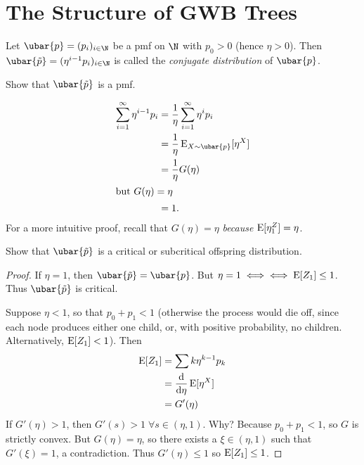 \section{The Structure of GWB Trees}
\begin{definition} \label{def:conjugate}
    Let $\ubar{p} = (p_i)_{i \in \N}$ be a pmf on $\N$ with $p_0 > 0$
    (hence $\eta > 0$).
    Then $\ubar{\tilde{p}} = (\eta^{i-1} p_i)_{i \in \N}$ is called the
    \emph{conjugate distribution} of $\ubar{p}$.
\end{definition}

\begin{exercise}
    Show that $\ubar{\tilde{p}}$ is a pmf.
\end{exercise}
\begin{solution}
    \begin{align*}
        \sum_{i=1}^\infty \eta^{i-1} p_i
            &= \frac1{\eta} \sum_{i=1}^\infty \eta^i p_i \\
            &= \frac1{\eta} \E_{X \sim \ubar{p}}[\eta^X] \\
            &= \frac1{\eta} G(\eta) \\
        \intertext{but $G(\eta) = \eta$}
            &= 1.
    \end{align*}
    For a more intuitive proof, recall that $G(\eta) = \eta$ \emph{because}
    $\operatorname{\mathrm{E}}[\eta^Z_1] = \eta$.
\end{solution}

\begin{exercise}
    Show that $\ubar{\tilde{p}}$ is a critical or subcritical offspring
    distribution.
\end{exercise}
\begin{proof}
    If $\eta = 1$, then $\ubar{\tilde{p}} = \ubar{p}$.
    But $\eta = 1 \iff \iff \operatorname{\mathrm{E}}[Z_1] \le 1$.
    Thus $\ubar{\tilde{p}}$ is critical.

    Suppose $\eta < 1$, so that $p_0 + p_1 < 1$
    (otherwise the process would die off, since each node produces either
    one child, or, with positive probability, no children.
    Alternatively, $\operatorname{\mathrm{E}}[Z_1] < 1$).
    Then \begin{align*}
        \operatorname{\mathrm{E}}[Z_1] &= \sum k \eta^{k-1} p_k \\
                &= \dv{}{\eta} \operatorname{\mathrm{E}}[\eta^X] \\
                &= G'(\eta)
    \end{align*}
    If $G'(\eta) > 1$, then $G'(s) > 1 \;\forall s \in (\eta, 1)$.
    Why? Because $p_0 + p_1 < 1$, so $G$ is strictly convex.
    But $G(\eta) = \eta$, so there exists a $\xi \in (\eta, 1)$ such that
    $G'(\xi) = 1$, a contradiction.
    Thus $G'(\eta) \le 1$ so $\operatorname{\mathrm{E}}[Z_1] \le 1$.
\end{proof}

